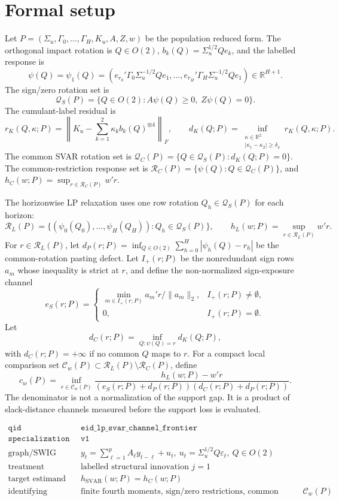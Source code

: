 \documentclass[11pt]{article}
\newcommand{\R}{\mathbb{R}}
\theoremstyle{definition}
\theoremstyle{plain}
\theoremstyle{remark}
\begin{document}
\section{Formal setup}
Let \(P=(\Sigma_u,\Gamma_0,\ldots,\Gamma_H,K_u,A,Z,w)\) be the population reduced form. The orthogonal impact rotation is \(Q\in O(2)\), \(b_k(Q)=\Sigma_u^{1/2}Qe_k\), and the labelled response is
\[
\psi(Q)=\psi_1(Q)=(e_{r_0}'\Gamma_0\Sigma_u^{-1/2}Qe_1,\ldots,e_{r_H}'\Gamma_H\Sigma_u^{-1/2}Qe_1)\in\R^{H+1}.
\]
The sign/zero rotation set is
\[
\mathcal Q_S(P)=\{Q\in O(2): A\psi(Q)\ge 0,\; Z\psi(Q)=0\}.
\]
The cumulant-label residual is
\[
r_K(Q,\kappa;P)=\left\|K_u-\sum_{k=1}^2\kappa_k b_k(Q)^{\otimes 4}\right\|_F,\qquad
d_K(Q;P)=\inf_{\substack{\kappa\in\R^2\\|\kappa_1-\kappa_2|\ge\delta_4}}r_K(Q,\kappa;P).
\]
The common SVAR rotation set is \(\mathcal Q_C(P)=\{Q\in\mathcal Q_S(P):d_K(Q;P)=0\}\). The common-restriction response set is \(\mathcal R_C(P)=\{\psi(Q):Q\in\mathcal Q_C(P)\}\), and \(h_C(w;P)=\sup_{r\in\mathcal R_C(P)}w'r\).

The horizonwise LP relaxation uses one row rotation \(Q_h\in \mathcal Q_S(P)\) for each horizon:
\[
\mathcal R_L(P)=\{(\psi_0(Q_0),\ldots,\psi_H(Q_H)):Q_h\in\mathcal Q_S(P)\},\qquad h_L(w;P)=\sup_{r\in\mathcal R_L(P)}w'r.
\]
For \(r\in\mathcal R_L(P)\), let \(d_P(r;P)=\inf_{Q\in O(2)}\sum_{h=0}^H|\psi_h(Q)-r_h|\) be the common-rotation pasting defect. Let \(I_+(r;P)\) be the nonredundant sign rows \(a_m\) whose inequality is strict at \(r\), and define the non-normalized sign-exposure channel
\[
e_S(r;P)=
\begin{cases}
\min_{m\in I_+(r;P)} a_m'r/\|a_m\|_2, & I_+(r;P)\ne\emptyset,\\
0, & I_+(r;P)=\emptyset.
\end{cases}
\]
Let
\[
d_C(r;P)=\inf_{Q:\psi(Q)=r}d_K(Q;P),
\]
with \(d_C(r;P)=+\infty\) if no common \(Q\) maps to \(r\). For a compact local comparison set \(\mathcal C_w(P)\subset\mathcal R_L(P)\setminus\mathcal R_C(P)\), define
\[
c_w(P)=\inf_{r\in\mathcal C_w(P)}
\frac{h_L(w;P)-w'r}{(e_S(r;P)+d_P(r;P))(d_C(r;P)+d_P(r;P))}.
\]
The denominator is not a normalization of the support gap. It is a product of slack-distance channels measured before the support loss is evaluated.

\[
\begin{array}{ll}
\texttt{qid} & \texttt{eid\_lp\_svar\_channel\_frontier}\\
\texttt{specialization} & \texttt{v1}\\
\text{graph/SWIG} & y_t=\sum_{\ell=1}^p A_\ell y_{t-\ell}+u_t,\ u_t=\Sigma_u^{1/2}Q\varepsilon_t,\ Q\in O(2)\\
\text{treatment} & \text{labelled structural innovation }j=1\\
\text{target estimand} & h_{\mathrm{SVAR}}(w;P)=h_C(w;P)\\
\text{identifying assumptions} & \text{finite fourth moments, sign/zero restrictions, common rotation, cumulant label, compact }\mathcal C_w(P)
\end{array}
\]
\end{document}
